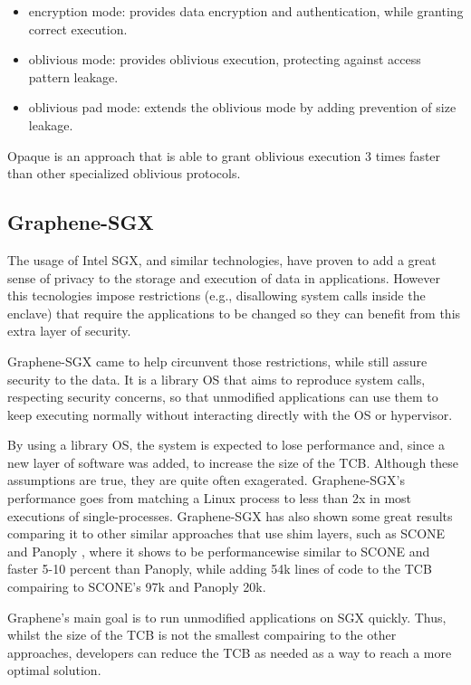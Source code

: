 \begin{itemize}
	\item encryption mode: provides data encryption and authentication, while granting correct execution.
	\item oblivious mode: provides oblivious execution, protecting against access pattern leakage.
	\item oblivious pad mode: extends the oblivious mode by adding prevention of size leakage.
\end{itemize}

Opaque is an approach that is able to grant oblivious execution 3 times faster than other specialized oblivious protocols.

\subsection{Graphene-SGX}
\label{ssec:grapheneSGX}

The usage of Intel SGX, and similar technologies, have proven to add a great sense of privacy to the storage and execution of data in applications. However this tecnologies impose restrictions (e.g., disallowing system calls inside the enclave) that require the applications to be changed so they can benefit from this extra layer of security. 

Graphene-SGX \cite{graphenePaper} came to help circunvent those restrictions, while still assure security to the data. It is a library OS that aims to reproduce system calls, respecting security concerns, so that unmodified applications can use them to keep executing normally without interacting directly with the OS or hypervisor. 

By using a library OS, the system is expected to lose performance and, since a new layer of software was added, to increase the size of the TCB. 
Although these assumptions are true, they are quite often exagerated. Graphene-SGX's performance goes from matching a Linux process to less than 2x in most executions of single-processes.
Graphene-SGX has also shown some great results comparing it to other similar approaches that use shim layers, such as SCONE \cite{sconePaper} and Panoply \cite{panoplyPaper}, where it shows to be performancewise similar to SCONE and faster 5-10 percent than Panoply, while adding 54k lines of code to the TCB compairing to SCONE's 97k and Panoply 20k.

Graphene's main goal is to run unmodified applications on SGX quickly. Thus, whilst the size of the TCB is not the smallest compairing to the other approaches, developers can reduce the TCB as needed as a way to reach a more optimal solution. 

